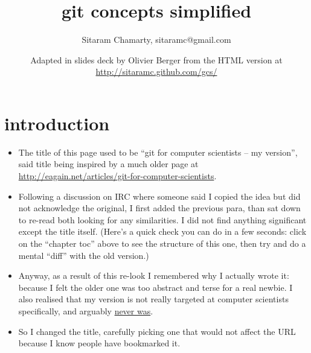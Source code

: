 \documentclass[presentation]{beamer}
\title{git concepts simplified}
\author{Sitaram Chamarty, sitaramc@gmail.com}
\date{Adapted in slides deck by Olivier Berger from the HTML version at \url{http://sitaramc.github.com/gcs/}}
\begin{document}
\maketitle












\section{introduction}
\label{sec-1}
\begin{frame}


\small
\begin{itemize}
\item The title of this page used to be ``git for computer scientists -- my
  version'', said title being inspired by a much older page at
  \href{http://eagain.net/articles/git-for-computer-scientists}{http://eagain.net/articles/git-for-computer-scientists}.
\item Following a discussion on IRC where someone said I copied the idea
  but did not acknowledge the original, I first added the previous
  para, than sat down to re-read both looking for any similarities.  I
  did not find anything significant except the title itself.  (Here's
  a quick check you can do in a few seconds: click on the ``chapter
  toc'' above to see the structure of this one, then try and do a
  mental ``diff'' with the old version.)
\item Anyway, as a result of this re-look I remembered why I actually
  wrote it: because I felt the older one was too abstract and terse
  for a real newbie.  I also realised that my version is not really
  targeted at computer scientists specifically, and arguably
  \href{https://github.com/sitaramc/git-notes/commit/13a2ffaca484a1136c256dc72e93a88eff8fd4ff}{never was}.
\item So I changed the title, carefully picking one that would not affect
  the URL because I know people have bookmarked it.
\end{itemize}
\end{frame}
\end{document}
